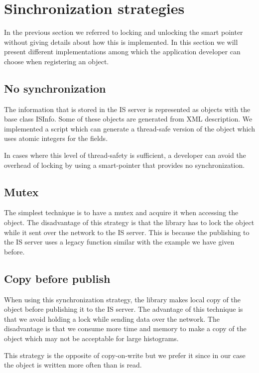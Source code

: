 \section*{Sinchronization strategies}
In the previous section we referred to locking and unlocking the smart pointer without giving details about how this is implemented. In this section we will present different implementations among which the application developer can choose when registering an object.

\subsection*{No synchronization}

The information that is stored in the IS server is represented as objects with the base class ISInfo. Some of these objects are generated from XML description. We implemented a script which can generate a thread-safe version of the object which uses atomic integers for the fields. 

In cases where this level of thread-safety is sufficient, a developer can avoid the overhead of locking by using a smart-pointer that provides no synchronization.

\subsection*{Mutex}

The simplest technique is to have a mutex and acquire it when accessing the object. The disadvantage of this strategy is that the library has to lock the object while it sent over the network to the IS server. This is because the publishing to the IS server uses a legacy function similar with the example we have given before.

\subsection*{Copy before publish}

When using this synchronization strategy, the library makes local copy of the object before publishing it to the IS server. The advantage of this technique is that we avoid holding a lock while sending data over the network. The disadvantage is that we consume more time and memory to make a copy of the object which may not be acceptable for large histograms.

This strategy is the opposite of copy-on-write but we prefer it since in our case the object is written more often than is read.

